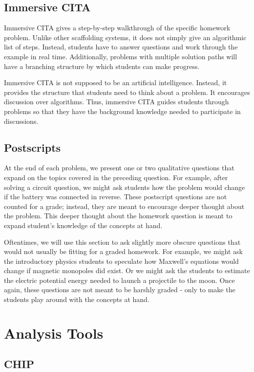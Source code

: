 \subsection{Immersive CITA}

Immersive CITA gives a step-by-step walkthrough of the specific homework problem. Unlike other scaffolding systems, it does not simply give an algorithmic list of steps. Instead, students have to answer questions and work through the example in real time. Additionally, problems with multiple solution paths will have a branching structure by which students can make progress.

Immersive CITA is not supposed to be an artificial intelligence. Instead, it provides the structure that students need to think about a problem. It encourages discussion over algorithms. Thus, immersive CITA guides students through problems so that they have the background knowledge needed to participate in discussions.

\subsection{Postscripts}

At the end of each problem, we present one or two qualitative questions that expand on the topics covered in the preceding question. For example, after solving a circuit question, we might ask students how the problem would change if the battery was connected in reverse. These postscript questions are not counted for a grade; instead, they are meant to encourage deeper thought about the problem. This deeper thought about the homework question is meant to expand student’s knowledge of the concepts at hand.

Oftentimes, we will use this section to ask slightly more obscure questions that would not usually be fitting for a graded homework. For example, we might ask the introductory physics students to speculate how Maxwell's equations would change if magnetic monopoles did exist. Or we might ask the students to estimate the electric potential energy needed to launch a projectile to the moon. Once again, these questions are not meant to be harshly graded - only to make the students play around with the concepts at hand.

\section{Analysis Tools}

\subsection{CHIP}

